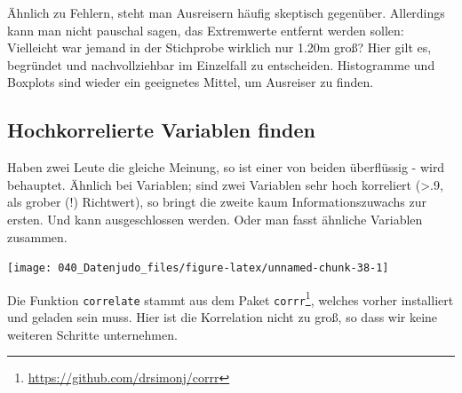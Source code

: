 \documentclass[12pt,]{book}
\makeatletter
\newenvironment{Shaded}{\begin{snugshade}}{\end{snugshade}}
\newcommand{\KeywordTok}[1]{\textcolor[rgb]{0.13,0.29,0.53}{\textbf{{#1}}}}
\newcommand{\StringTok}[1]{\textcolor[rgb]{0.31,0.60,0.02}{{#1}}}
\newcommand{\CommentTok}[1]{\textcolor[rgb]{0.56,0.35,0.01}{\textit{{#1}}}}
\newcommand{\NormalTok}[1]{{#1}}
\newenvironment{kframe}{%
\medskip{}
\setlength{\fboxsep}{.8em}
 \def\at@end@of@kframe{}%
 \ifinner\ifhmode%
  \def\at@end@of@kframe{\end{minipage}}%
  \begin{minipage}{\columnwidth}%
 \fi\fi%
 \def\FrameCommand##1{\hskip\@totalleftmargin \hskip-\fboxsep
 \colorbox{shadecolor}{##1}\hskip-\fboxsep
     \hskip-\linewidth \hskip-\@totalleftmargin \hskip\columnwidth}%
 \MakeFramed {\advance\hsize-\width
   \@totalleftmargin\z@ \linewidth\hsize
   \@setminipage}}%
 {\par\unskip\endMakeFramed%
 \at@end@of@kframe}
\renewenvironment{Shaded}{\begin{kframe}}{\end{kframe}}
\makeatother
\begin{document}
Ähnlich zu Fehlern, steht man Ausreisern häufig skeptisch gegenüber.
Allerdings kann man nicht pauschal sagen, das Extremwerte entfernt
werden sollen: Vielleicht war jemand in der Stichprobe wirklich nur
1.20m groß? Hier gilt es, begründet und nachvollziehbar im Einzelfall zu
entscheiden. Histogramme und Boxplots sind wieder ein geeignetes Mittel,
um Ausreiser zu finden.

\subsection{Hochkorrelierte Variablen
finden}\label{hochkorrelierte-variablen-finden}

Haben zwei Leute die gleiche Meinung, so ist einer von beiden
überflüssig - wird behauptet. Ähnlich bei Variablen; sind zwei Variablen
sehr hoch korreliert (\textgreater{}.9, als grober (!) Richtwert), so
bringt die zweite kaum Informationszuwachs zur ersten. Und kann
ausgeschlossen werden. Oder man fasst ähnliche Variablen zusammen.

\begin{Shaded}
\end{Shaded}

\begin{center}\texttt{[image: 040\_Datenjudo\_files/figure-latex/unnamed-chunk-38-1]} \end{center}

Die Funktion \texttt{correlate} stammt aus dem Paket
\texttt{corrr}\footnote{\url{https://github.com/drsimonj/corrr}},
welches vorher installiert und geladen sein muss. Hier ist die
Korrelation nicht zu groß, so dass wir keine weiteren Schritte
unternehmen.
\end{document}
